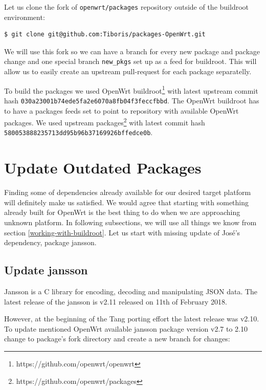 Let us clone the fork of {\tt openwrt/packages} repository outside of the buildroot environment:
\begin{lstlisting}[columns=fixed,basicstyle=\ttfamily\footnotesize,tabsize=4,backgroundcolor=\color{yellow!10}]
$ git clone git@github.com:Tiboris/packages-OpenWrt.git
\end{lstlisting}
We will use this fork so we can have a branch for every new package and package change and one special branch {\tt new\_pkgs} set up as a feed for buildroot.
This will allow us to easily create an upstream pull-request for each package separatelly.

To build the packages we used OpenWrt buildroot\footnote{https://github.com/openwrt/openwrt} with latest upstream commit hash {\tt 030a23001b74ede5fa2e6070a8fb04f3feccfbbd}.
The OpenWrt buildroot has to have a packages feeds set to point to repository with available OpenWrt packages.
We used upstream packages\footnote{https://github.com/openwrt/packages} with latest commit hash {\tt 580053888235713dd95b96b37169926bffedce0b}.


\section{Update Outdated Packages}

Finding some of dependencies already available for our desired target platform will definitely make us satisfied.
We would agree that starting with something already built for OpenWrt is the best thing to do when we are approaching unknown platform.
In following subsections, we will use all things we know from section \ref{working-with-buildroot}.
Let us start with missing update of José's dependency, package jansson.



\subsection{Update jansson}\label{jansson}
Jansson is a C library for encoding, decoding and manipulating JSON data.
The latest release of the jansson is v2.11 released on 11th of February 2018\cite{jansson}.

However, at the beginning of the Tang porting effort the latest release was v2.10.
To update mentioned OpenWrt available jansson package version v2.7 to 2.10 change to package's fork directory and create a new branch for changes:

